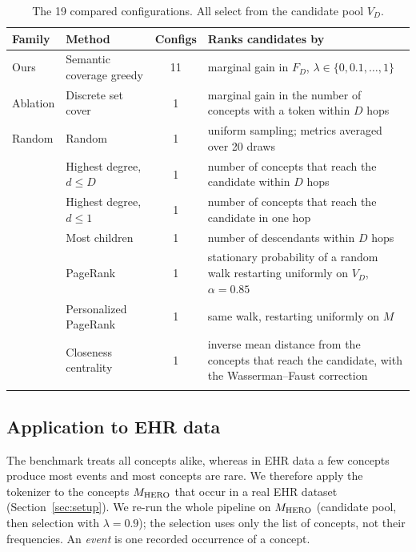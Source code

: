 \begin{table}[t]
\centering
\small
\renewcommand{\arraystretch}{1.2}
\setlength{\tabcolsep}{4pt}
\begin{tabular}{@{}>{\raggedright\arraybackslash}p{1.6cm}>{\raggedright\arraybackslash}p{3.0cm}c>{\raggedright\arraybackslash}p{7.6cm}@{}}
\toprule
\textbf{Family} & \textbf{Method} & \textbf{Configs} & \textbf{Ranks candidates by} \\
\midrule
Ours & Semantic coverage greedy & 11 & marginal gain in $F_D$, $\lambda \in \{0, 0.1, \dots, 1\}$ \\
Ablation & Discrete set cover & 1 & marginal gain in the number of concepts with a token within $D$ hops \\
Random & Random & 1 & uniform sampling; metrics averaged over 20 draws \\
\midrule
\multirow{3}{*}{Degree} & Highest degree, $d \le D$ & 1 & number of concepts that reach the candidate within $D$ hops \\
 & Highest degree, $d \le 1$ & 1 & number of concepts that reach the candidate in one hop \\
 & Most \isa{} children & 1 & number of descendants within $D$ \isa{} hops \\
\midrule
\multirow{3}{*}{Centrality} & PageRank & 1 & stationary probability of a random walk restarting uniformly on $V_D$, $\alpha = 0.85$ \cite{page1999pagerank} \\
 & Personalized PageRank & 1 & same walk, restarting uniformly on $M$ \cite{haveliwala2002topic} \\
 & Closeness centrality & 1 & inverse mean distance from the concepts that reach the candidate, with the Wasserman--Faust correction \cite{freeman1978centrality, wasserman1994social} \\
\midrule
\multicolumn{2}{@{}l}{\textbf{Total}} & 19 & \\
\bottomrule
\end{tabular}
\caption{The 19 compared configurations. All select from the candidate pool $V_D$.}
\label{tab:baselines}
\end{table}

\subsection{Application to EHR data}
\label{sec:method:ehr}

The benchmark treats all concepts alike, whereas in EHR data a few concepts produce most events and most concepts are rare.
We therefore apply the tokenizer to the concepts $M_{\mathrm{HERO}}$ that occur in a real EHR dataset (Section~\ref{sec:setup}).
We re-run the whole pipeline on $M_{\mathrm{HERO}}$ (candidate pool, then selection with $\lambda = 0.9$); the selection uses only the list of concepts, not their frequencies.
An \emph{event} is one recorded occurrence of a concept.

